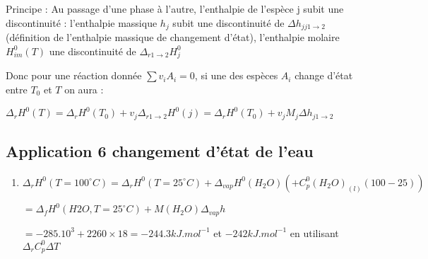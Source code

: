 \documentclass[a4paper,12pt]{book}
\begin{document}
\par Principe : Au passage d'une phase à l'autre, l'enthalpie de l'espèce j subit une discontinuité : l'enthalpie massique $h_j$ subit une discontinuité de $\Delta h_{jj1\to 2}$ (définition de l'enthalpie massique de changement d'état), l'enthalpie molaire $H^0_{im}(T)$ une discontinuité de $\Delta_{r1\to 2}H_j^0$ \par Donc pour une réaction donnée $\sum v_iA_i=0$, si une des espèces $A_i$ change d'état entre $T_0$ et $T$ on aura :
\par $\Delta_rH^0(T)=\Delta_rH^0(T_0)+v_j\Delta_{r1\to 2}H^0(j)=\Delta_rH^0(T_0)+v_jM_j\Delta h_{j1\to 2}$

\subsection{Application 6 changement d'état de l'eau}
\begin{enumerate}
\item $\Delta_rH^0(T=100^\circ C)=\Delta_rH^0(T=25^\circ C)+\Delta_{vap}H^0(H_2O)(+C_p^0(H_2O)_{(l)}(100-25))$ \par $=\Delta_fH^0(H2O,T=25^\circ C)+M(H_2O)\Delta_{vap}h$ \par $=-285.10^3+2260\times 18=-244.3kJ.mol^{-1}$ et $-242kJ.mol^{-1}$ en utilisant $\Delta_rC_p^0\Delta T$
\end{enumerate}
\end{document}
